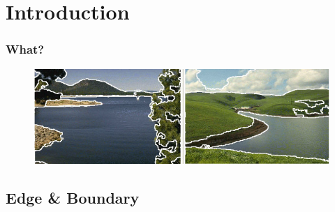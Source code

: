\documentclass[notheorems,serif,table,compress]{beamer}  %
\begin{document}
\section{Introduction}



\begin{frame}[fragile]
\frametitle{What?}
    \begin{figure}
    \includegraphics[width=0.8\linewidth]{edgeseg.png} 
    \end{figure}
\end{frame}


\subsection{Edge \& Boundary}
\end{document}

